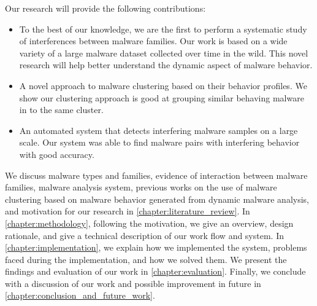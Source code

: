 Our research will provide the following contributions:
\begin{itemize}
  \item To the best of our knowledge, we are the first to perform a systematic study of interferences between malware families.
    Our work is based on a wide variety of a large malware dataset collected over time in the wild.
    This novel research will help better understand the dynamic aspect of malware behavior.
  \item A novel approach to malware clustering based on their behavior profiles.
    We show our clustering approach is good at grouping similar behaving malware in to the same cluster.
  \item An automated system that detects interfering malware samples on a large scale.
  Our system was able to find malware pairs with interfering behavior with good accuracy.
\end{itemize}
We discuss malware types and families, evidence of interaction between malware families, malware analysis system, previous works on the use of malware clustering based on malware behavior generated from dynamic malware analysis, and motivation for our research in \autoref{chapter:literature_review}.
In \autoref{chapter:methodology}, following the motivation, we give an overview, design rationale, and give a technical description of our work flow and system.
In \autoref{chapter:implementation}, we explain how we implemented the system, problems faced during the implementation, and how we solved them.
We present the findings and evaluation of our work in \autoref{chapter:evaluation}.
Finally, we conclude with a discussion of our work and possible improvement in future in \autoref{chapter:conclusion_and_future_work}.

